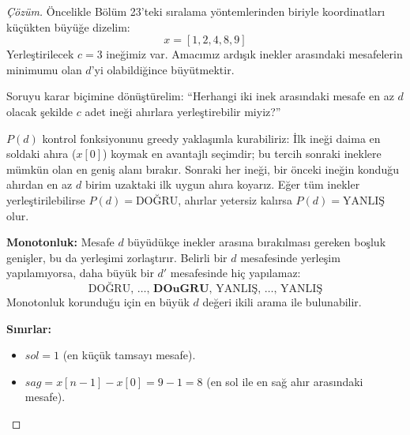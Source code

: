\begin{proof}[Çözüm]
Öncelikle Bölüm 23'teki sıralama yöntemlerinden biriyle koordinatları küçükten büyüğe dizelim:
\[ x = [1, 2, 4, 8, 9] \]
Yerleştirilecek $c = 3$ ineğimiz var. Amacımız ardışık inekler arasındaki mesafelerin minimumu olan $d$'yi olabildiğince büyütmektir.

Soruyu karar biçimine dönüştürelim:
``Herhangi iki inek arasındaki mesafe en az $d$ olacak şekilde $c$ adet ineği ahırlara yerleştirebilir miyiz?''

$P(d)$ kontrol fonksiyonunu greedy yaklaşımla kurabiliriz:
İlk ineği daima en soldaki ahıra ($x[0]$) koymak en avantajlı seçimdir; bu tercih sonraki ineklere mümkün olan en geniş alanı bırakır.
Sonraki her ineği, bir önceki ineğin konduğu ahırdan en az $d$ birim uzaktaki ilk uygun ahıra koyarız. Eğer tüm inekler yerleştirilebilirse $P(d) = \text{DOĞRU}$, ahırlar yetersiz kalırsa $P(d) = \text{YANLIŞ}$ olur.

\textbf{Monotonluk:}
Mesafe $d$ büyüdükçe inekler arasına bırakılması gereken boşluk genişler, bu da yerleşimi zorlaştırır. Belirli bir $d$ mesafesinde yerleşim yapılamıyorsa, daha büyük bir $d'$ mesafesinde hiç yapılamaz:
\[ \text{DOĞRU}, \, \dots, \, \mathbf{DOu{G}RU}, \, \text{YANLIŞ}, \, \dots, \, \text{YANLIŞ} \]
Monotonluk korunduğu için en büyük $d$ değeri ikili arama ile bulunabilir.

\textbf{Sınırlar:}
\begin{itemize}
    \item $sol = 1$ (en küçük tamsayı mesafe).
    \item $sag = x[n-1] - x[0] = 9 - 1 = 8$ (en sol ile en sağ ahır arasındaki mesafe).
\end{itemize}


\end{proof}
